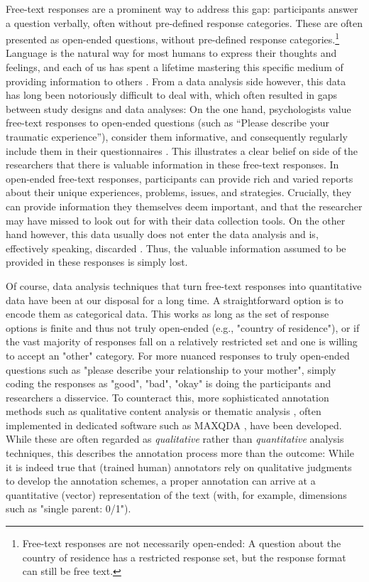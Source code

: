 \documentclass[man,floatsintext]{apa7}
\newcommand{\change}[1]{#1}
\begin{document}
\change{Free-text responses are a prominent way to address this gap: participants answer a question verbally, often without pre-defined response categories.} These are often presented as open-ended questions, without pre-defined response categories.\footnote{Free-text responses are not necessarily open-ended: A question about the country of residence has a restricted response set, but the response format can still be free text.} Language is the natural way for most humans to express their thoughts and feelings, and each of us has spent a lifetime mastering this specific medium of providing information to others \parencite{kjell2023text,tausczik2010psychological}. From a data analysis side however, this data has long been notoriously difficult to deal with, which often resulted in gaps between  study designs and  data analyses: On the one hand, psychologists value free-text responses to open-ended questions (such as ``Please describe your traumatic experience''), consider them informative, and consequently regularly include them in their questionnaires \parencite{schuman1979open,singer2017some}. This illustrates a clear belief on side of the researchers that there is valuable information in these free-text responses. In open-ended free-text responses, participants can provide rich and varied reports about their unique experiences, problems, issues, and strategies. Crucially, they can provide information they themselves deem important, and that the researcher may have missed to look out for with their data collection tools. On the other hand however, this data usually does not enter the data analysis and is, effectively speaking, discarded \parencite{singer2017some,roberts2014structural}. Thus, the valuable information assumed to be provided in these responses is simply lost.

Of course, data analysis techniques that turn free-text responses into quantitative data have been at our disposal for a long time. A straightforward option is to encode them as categorical data. This works as long as the set of response options is finite and thus not truly open-ended (e.g., "country of residence"), or if the vast majority of responses fall on a relatively restricted set and one is willing to accept an "other" category. For more nuanced responses to truly open-ended questions such as "please describe your relationship to your mother", simply coding the responses as "good", "bad", "okay" is doing the participants and researchers a disservice. To counteract this, more sophisticated annotation methods such as qualitative content analysis \parencite{mayring2014qualitative} or thematic analysis \parencite{braun2006using}, often implemented in dedicated software such as MAXQDA \parencite{maxqda}, have been developed. While these are often regarded as \emph{qualitative} rather than \emph{quantitative} analysis techniques, this describes the annotation process more than the outcome: While it is indeed true that (trained human) annotators rely on qualitative judgments to develop the annotation schemes, a proper annotation can arrive at a quantitative (vector) representation of the text (with, for example, dimensions such as "single parent: 0/1"). 
\end{document}
